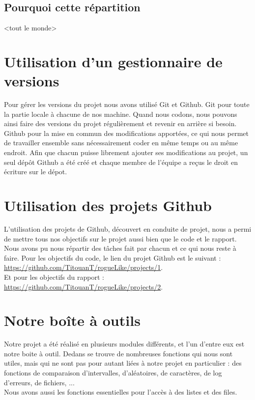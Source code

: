 \documentclass[11pt]{report}
\begin{document}
		\subsection{Pourquoi cette répartition}
		
		<tout le monde>

	\section{Utilisation d'un gestionnaire de versions}
	
		Pour gérer les versions du projet nous avons utilisé Git et Github. Git pour toute la partie locale à chacune de nos machine. Quand nous codons, nous pouvons ainsi faire des versions du projet régulièrement et revenir en arrière si besoin. Github pour la mise en commun des modifications apportées, ce qui nous permet de travailler ensemble sans nécessairement coder en même temps ou au même endroit. Afin que chacun puisse librement ajouter ses modifications au projet, un seul dépôt Github a été créé et chaque membre de l'équipe a reçus le droit en écriture sur le dépot.
	
	\section{Utilisation des projets Github}
	
		L'utilisation des projets de Github, découvert en conduite de projet, nous a permi de mettre tous nos objectifs sur le projet aussi bien que le code et le rapport. Nous avons pu nous répartir des tâches fait par chacun et ce qui nous reste à faire.
		Pour les objectifs du code, le lien du projet Github est le suivant : \href{https://github.com/TitouanT/rogueLike/projects/1}{ https://github.com/TitouanT/rogueLike/projects/1}. \\
		Et pour les objectifs du rapport :  \href{https://github.com/TitouanT/rogueLike/projects/2} {https://github.com/TitouanT/rogueLike/projects/2}.

	\section{Notre boîte à outils} 

		Notre projet a été réalisé en plusieurs modules différents, et l'un d'entre eux est notre boite à outil. Dedans se trouve de nombreuses fonctions qui nous sont utiles, mais qui ne sont pas pour autant liées à notre projet en particulier : des fonctions de comparaison d'intervalles, d'aléatoires, de caractères, de log d'erreurs, de fichiers, ...\\
		Nous avons aussi les fonctions essentielles pour l'accès à des listes et des files.
\end{document}
